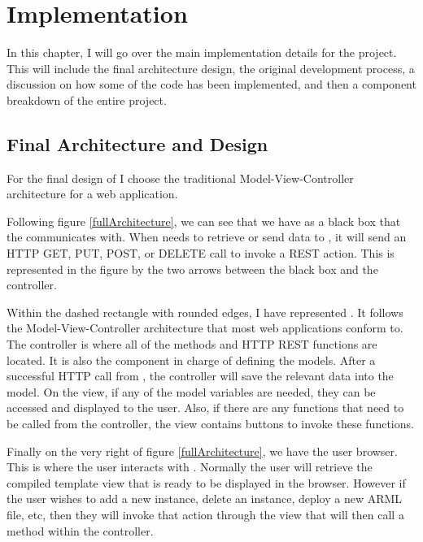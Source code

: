 
\cleardoublepage

\chapter{\projectName{} Implementation}
\label{makereference3}

In this chapter, I will go over the main implementation details for the project. This will include the final architecture design, the original development process, a discussion on how some of the code has been implemented, and then a component breakdown of the entire project.

\section{Final Architecture and Design}
\label{makereference3.1}

For the final design of \projectName{} I choose the traditional Model-View-Controller architecture for a web application.

Following figure \ref{fullArchitecture}, we can see that we have \ancor{} as a black box that the \projectName{} communicates with. When \projectName{} needs to retrieve or send data to \ancor{}, it will send an HTTP GET, PUT, POST, or DELETE call to invoke a REST action. This is represented in the figure by the two arrows between the \ancor{} black box and the controller.

Within the dashed rectangle with rounded edges, I have represented \projectName{}. It follows the Model-View-Controller architecture that most web applications conform to. The controller is where all of the methods and HTTP REST functions are located. It is also the component in charge of defining the models. After a successful HTTP call from \ancor{}, the controller will save the relevant data into the model. On the view, if any of the model variables are needed, they can be accessed and displayed to the user. Also, if there are any functions that need to be called from the controller, the view contains buttons to invoke these functions.

Finally on the very right of figure \ref{fullArchitecture}, we have the user browser. This is where the user interacts with \projectName{}. Normally the user will retrieve the compiled template view that is ready to be displayed in the browser. However if the user wishes to add a new instance, delete an instance, deploy a new ARML file, etc, then they will invoke that action through the view that will then call a method within the controller.

